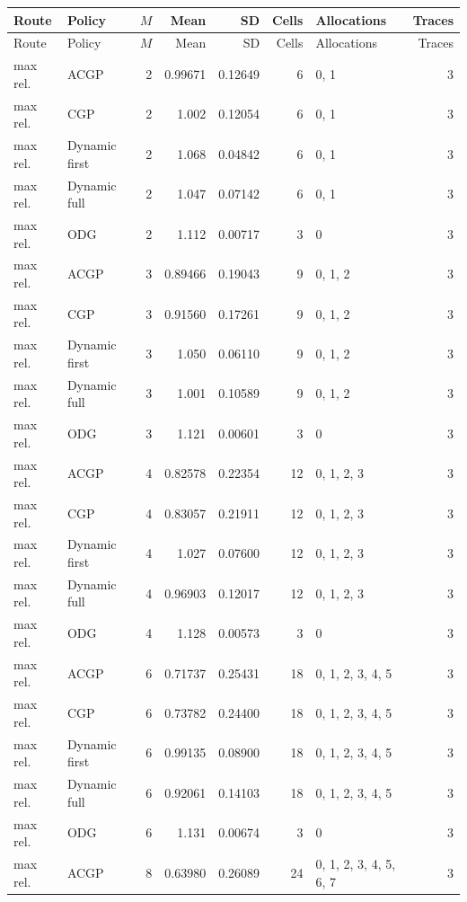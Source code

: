\documentclass[10pt,a4paper]{article}
\begin{document}
\tiny\setlength{\tabcolsep}{2pt}\begin{longtable}{@{}p{23mm}p{29mm}rrrrp{36mm}r@{}}
\toprule Route & Policy & $M$ & Mean & SD & Cells & Allocations & Traces \\ \midrule\endfirsthead
\toprule Route & Policy & $M$ & Mean & SD & Cells & Allocations & Traces \\ \midrule\endhead
\bottomrule\endfoot
max rel. & ACGP & 2 & 0.99671 & 0.12649 & 6 & 0, 1 & 3 \\
max rel. & CGP & 2 & 1.002 & 0.12054 & 6 & 0, 1 & 3 \\
max rel. & Dynamic first & 2 & 1.068 & 0.04842 & 6 & 0, 1 & 3 \\
max rel. & Dynamic full & 2 & 1.047 & 0.07142 & 6 & 0, 1 & 3 \\
max rel. & ODG & 2 & 1.112 & 0.00717 & 3 & 0 & 3 \\
max rel. & ACGP & 3 & 0.89466 & 0.19043 & 9 & 0, 1, 2 & 3 \\
max rel. & CGP & 3 & 0.91560 & 0.17261 & 9 & 0, 1, 2 & 3 \\
max rel. & Dynamic first & 3 & 1.050 & 0.06110 & 9 & 0, 1, 2 & 3 \\
max rel. & Dynamic full & 3 & 1.001 & 0.10589 & 9 & 0, 1, 2 & 3 \\
max rel. & ODG & 3 & 1.121 & 0.00601 & 3 & 0 & 3 \\
max rel. & ACGP & 4 & 0.82578 & 0.22354 & 12 & 0, 1, 2, 3 & 3 \\
max rel. & CGP & 4 & 0.83057 & 0.21911 & 12 & 0, 1, 2, 3 & 3 \\
max rel. & Dynamic first & 4 & 1.027 & 0.07600 & 12 & 0, 1, 2, 3 & 3 \\
max rel. & Dynamic full & 4 & 0.96903 & 0.12017 & 12 & 0, 1, 2, 3 & 3 \\
max rel. & ODG & 4 & 1.128 & 0.00573 & 3 & 0 & 3 \\
max rel. & ACGP & 6 & 0.71737 & 0.25431 & 18 & 0, 1, 2, 3, 4, 5 & 3 \\
max rel. & CGP & 6 & 0.73782 & 0.24400 & 18 & 0, 1, 2, 3, 4, 5 & 3 \\
max rel. & Dynamic first & 6 & 0.99135 & 0.08900 & 18 & 0, 1, 2, 3, 4, 5 & 3 \\
max rel. & Dynamic full & 6 & 0.92061 & 0.14103 & 18 & 0, 1, 2, 3, 4, 5 & 3 \\
max rel. & ODG & 6 & 1.131 & 0.00674 & 3 & 0 & 3 \\
max rel. & ACGP & 8 & 0.63980 & 0.26089 & 24 & 0, 1, 2, 3, 4, 5, 6, 7 & 3 \\

\end{longtable}
\end{document}
